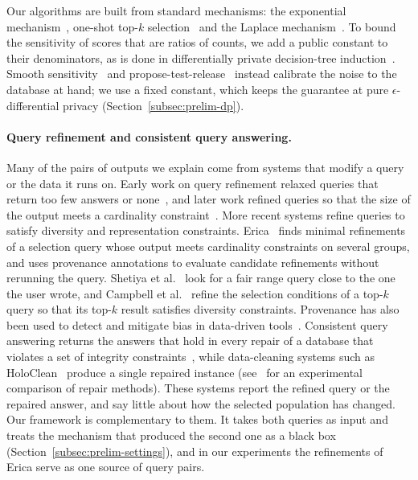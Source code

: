 Our algorithms are built from standard mechanisms: the exponential mechanism~\cite{mcsherry2007}, one-shot top-$k$ selection~\cite{DurfeeRogers19} and the Laplace mechanism~\cite{DMNS2006}.
To bound the sensitivity of scores that are ratios of counts, we add a public constant to their denominators, as is done in differentially private decision-tree induction~\cite{FriedmanSchuster10}.
Smooth sensitivity~\cite{NissimRS07} and propose-test-release~\cite{DworkLei09} instead calibrate the noise to the database at hand; we use a fixed constant, which keeps the guarantee at pure $\epsilon$-differential privacy (Section~\ref{subsec:prelim-dp}).

\paragraph{Query refinement and consistent query answering.}
Many of the pairs of outputs we explain come from systems that modify a query or the data it runs on.
Early work on query refinement relaxed queries that return too few answers or none~\cite{chu1994structured,muslea2005online,KoudasLTV06}, and later work refined queries so that the size of the output meets a cardinality constraint~\cite{MK09}.
More recent systems refine queries to satisfy diversity and representation constraints.
Erica~\cite{LMSJ23,ERICA} finds minimal refinements of a selection query whose output meets cardinality constraints on several groups, and uses provenance annotations to evaluate candidate refinements without rerunning the query.
Shetiya et al.~\cite{SSAD22} look for a fair range query close to the one the user wrote, and Campbell et al.~\cite{CSSM24} refine the selection conditions of a top-$k$ query so that its top-$k$ result satisfies diversity constraints.
Provenance has also been used to detect and mitigate bias in data-driven tools~\cite{MLJ22}.
Consistent query answering returns the answers that hold in every repair of a database that violates a set of integrity constraints~\cite{arenas1999,bertossi2006,bertossi2011,chomicki2004}, while data-cleaning systems such as HoloClean~\cite{rekatsinas2017} produce a single repaired instance (see~\cite{NiMZWLY24} for an experimental comparison of repair methods).
These systems report the refined query or the repaired answer, and say little about how the selected population has changed.
Our framework is complementary to them.
It takes both queries as input and treats the mechanism that produced the second one as a black box (Section~\ref{subsec:prelim-settings}), and in our experiments the refinements of Erica serve as one source of query pairs.

